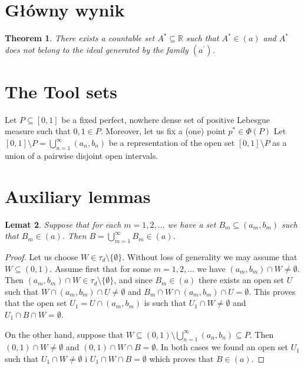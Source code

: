 \documentclass[12pt]{amsart}
\theoremstyle{plain}
\newtheorem{theorem}{Theorem}[section]
\newtheorem{lemma}[theorem]{Lemat}
\theoremstyle{definition}
\theoremstyle{remark}
\newcommand{\real}{\mathbb{R}}
\newcommand{\aideal}{\mathit{(a)}}
\newcommand{\aidealprime}{\mathit{(a^\prime)}}
\begin{document}
\section{Główny wynik}
\begin{theorem}
  There exists a countable set $A^* \subseteq \real$
  such that $A^* \in \aideal$ and $A^*$ does not belong to the
  ideal generated by the family $\aidealprime$.
\end{theorem}

\section{The Tool sets}

Let $P \subseteq [0,1]$ be a fixed perfect, nowhere dense
set of positive Lebesgue measure such that
$0, 1 \in P$. Moreover, let us fix a (one)
point $p^* \in \Phi(P)$
Let $[0, 1] \setminus P = \bigcup_{n=1}^\infty (a_n, b_n)$ be
a representation of the open set $[0, 1] \setminus P$
as a union of a pairwise disjoint open intervals.

\section{Auxiliary lemmas}

\begin{lemma}
  \label{lemat-o-sumie}
  Suppose that for each $m = 1,2,\ldots$
we have a set 
$B_m \subseteq (a_m, b_m)$ such that $B_m \in \aideal$.
Then $B = \bigcup_{m=1}^{\infty} B_m \in \aideal$.
\end{lemma}

\begin{proof}
  Let us choose $W \in \tau_d \setminus \lbrace \emptyset \rbrace$.
  Without loss of generality we may assume that
$W \subseteq (0, 1)$. Assume first that for some 
$m = 1,2,\ldots$ we have $(a_m, b_m) \cap W \not= \emptyset$.
Then $(a_m, b_m) \cap W \in \tau_d \setminus \lbrace \emptyset \rbrace$,
and since $B_m \in \aideal$ there exists an open set $U$ 
such that $W \cap (a_m, b_m) \cap U \not=\emptyset$
and $B_m \cap W \cap (a_m, b_m) \cap U = \emptyset$. This proves that
the open set $U_1 = U \cap (a_m, b_m)$ is such that $U_1 \cap W \not=\emptyset$
and $U_1 \cap B \cap W = \emptyset$.

On the other hand, suppose that
$W \subseteq (0,1) \setminus \bigcup_{n=1}^\infty (a_n, b_n) \subseteq P$.
Then $(0,1) \cap W \not= \emptyset$
and $(0,1) \cap W \cap B = \emptyset$.
In both cases we found an open set $U_1$ such that
$U_1 \cap W \not=\emptyset$ i $U_1 \cap W \cap B = \emptyset$
which proves that $B \in \aideal$.
\end{proof}
\end{document}
